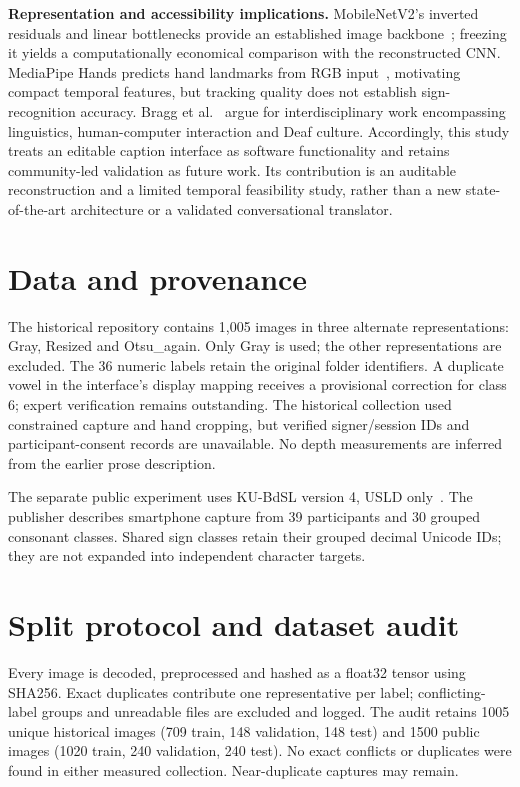 \documentclass[11pt,a4paper]{article}
\begin{document}
\textbf{Representation and accessibility implications.}
MobileNetV2's inverted residuals and linear bottlenecks provide an established image backbone~\cite{mobilenet}; freezing it yields a computationally economical comparison with the reconstructed CNN. MediaPipe Hands predicts hand landmarks from RGB input~\cite{hands}, motivating compact temporal features, but tracking quality does not establish sign-recognition accuracy. Bragg et al.~\cite{bragg} argue for interdisciplinary work encompassing linguistics, human-computer interaction and Deaf culture. Accordingly, this study treats an editable caption interface as software functionality and retains community-led validation as future work. Its contribution is an auditable reconstruction and a limited temporal feasibility study, rather than a new state-of-the-art architecture or a validated conversational translator.
\section{Data and provenance}
The historical repository contains 1,005 images in three alternate representations: Gray, Resized and Otsu\_again. Only Gray is used; the other representations are excluded. The 36 numeric labels retain the original folder identifiers. A duplicate vowel in the interface's display mapping receives a provisional correction for class 6; expert verification remains outstanding. The historical collection used constrained capture and hand cropping, but verified signer/session IDs and participant-consent records are unavailable. No depth measurements are inferred from the earlier prose description.

The separate public experiment uses KU-BdSL version 4, USLD only~\cite{kubdsl,kudata}. The publisher describes smartphone capture from 39 participants and 30 grouped consonant classes. Shared sign classes retain their grouped decimal Unicode IDs; they are not expanded into independent character targets.

\section{Split protocol and dataset audit}
Every image is decoded, preprocessed and hashed as a float32 tensor using SHA256. Exact duplicates contribute one representative per label; conflicting-label groups and unreadable files are excluded and logged. The audit retains 1005 unique historical images (709 train, 148 validation, 148 test) and 1500 public images (1020 train, 240 validation, 240 test). No exact conflicts or duplicates were found in either measured collection. Near-duplicate captures may remain.
\end{document}
